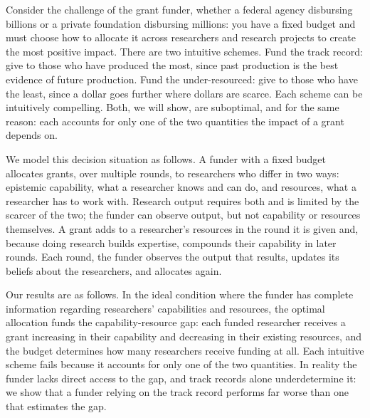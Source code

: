 \documentclass[article, 11pt, reqno]{amsart}
\theoremstyle{named}
\begin{document}
Consider the challenge of the grant funder, whether a federal agency disbursing billions or
a private foundation disbursing millions: you have a fixed budget and must choose how to
allocate it across researchers and research projects to create the most positive impact.
There are two intuitive schemes. Fund the track record: give to those who have produced the
most, since past production is the best evidence of future production. Fund the
under-resourced: give to those who have the least, since a dollar goes further where dollars
are scarce. Each scheme can be intuitively compelling. Both, we will show, are suboptimal,
and for the same reason: each accounts for only one of the two quantities the impact of a
grant depends on.

We model this decision situation as follows. A funder with a fixed budget allocates
grants, over multiple rounds, to researchers who differ in two ways: epistemic capability,
what a researcher knows and can do, and resources, what a researcher has to work with.
Research output requires both and is limited by the scarcer of the two; the funder can
observe output, but not capability or resources themselves. A grant adds to a researcher's resources in
the round it is given and, because doing research builds expertise, compounds their
capability in later rounds. Each round, the funder observes the output that results,
updates its beliefs about the researchers, and allocates again.

Our results are as follows. In the ideal condition where the funder has complete
information regarding researchers' capabilities and resources, the optimal allocation funds
the capability-resource gap: each funded researcher receives a grant increasing in their
capability and decreasing in their existing resources, and the budget determines how many
researchers receive funding at all. Each intuitive scheme fails because it
accounts for only one of the two quantities. In reality the funder lacks direct access to
the gap, and track records alone underdetermine it: we show that a funder relying on the
track record performs far worse than one that estimates the gap.
\end{document}
